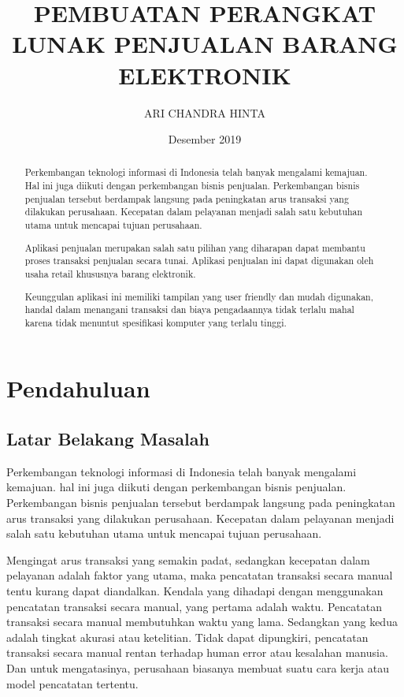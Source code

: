 \documentclass{article}
\title{PEMBUATAN PERANGKAT LUNAK PENJUALAN BARANG ELEKTRONIK}
\author{ ARI CHANDRA HINTA }
\date{Desember 2019}
\begin{document}
\maketitle

\begin{abstract}


Perkembangan teknologi informasi di Indonesia telah banyak mengalami kemajuan. Hal ini juga diikuti dengan perkembangan bisnis penjualan. Perkembangan bisnis penjualan tersebut berdampak langsung pada peningkatan arus transaksi yang dilakukan perusahaan. Kecepatan dalam pelayanan menjadi salah satu kebutuhan utama untuk mencapai tujuan perusahaan.

Aplikasi penjualan merupakan salah satu pilihan yang diharapan dapat membantu proses transaksi penjualan secara tunai. Aplikasi penjualan ini dapat digunakan oleh usaha retail khususnya barang elektronik.

Keunggulan aplikasi ini memiliki tampilan yang user friendly dan mudah digunakan, handal dalam menangani transaksi dan biaya pengadaannya tidak terlalu mahal karena tidak menuntut spesifikasi komputer yang terlalu tinggi.


\end{abstract}
\newpage
\tableofcontents
\newpage
\section{Pendahuluan}
\subsection{Latar Belakang Masalah}
Perkembangan teknologi informasi di Indonesia telah banyak mengalami kemajuan. hal ini juga diikuti dengan perkembangan bisnis penjualan. Perkembangan bisnis penjualan tersebut berdampak langsung pada peningkatan arus transaksi yang dilakukan perusahaan. Kecepatan dalam pelayanan menjadi salah satu kebutuhan utama untuk mencapai tujuan perusahaan.

Mengingat arus transaksi yang semakin padat, sedangkan kecepatan dalam pelayanan adalah faktor yang utama, maka pencatatan transaksi secara manual tentu kurang dapat diandalkan. Kendala yang dihadapi dengan menggunakan pencatatan transaksi secara manual, yang pertama adalah waktu. Pencatatan transaksi secara manual membutuhkan waktu yang lama. Sedangkan yang kedua adalah tingkat akurasi atau ketelitian. Tidak dapat dipungkiri, pencatatan transaksi secara manual rentan terhadap human error atau kesalahan manusia. Dan untuk mengatasinya, perusahaan biasanya membuat suatu cara kerja atau model pencatatan tertentu.
\end{document}
